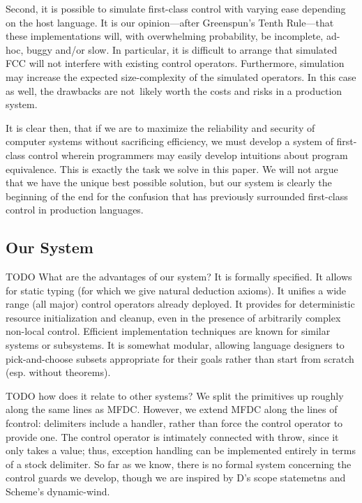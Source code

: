 \documentclass[11pt]{article}
\begin{document}
Second, it is possible to simulate first-class control with varying ease depending on the host language.
It is our opinion---after Greenspun's Tenth Rule---that these implementations will, with overwhelming probability, be incomplete, ad-hoc, buggy and/or slow.
In particular, it is difficult to arrange that simulated FCC will not interfere with existing control operators.\cite{addDelimControlProduction}
Furthermore, simulation may increase the expected size-complexity of the simulated operators.\cite{finalShiftForCallcc}
In this case as well, the drawbacks are not~likely worth the costs and risks in a production system.

It is clear then, that if we are to maximize the reliability and security of computer systems without sacrificing efficiency, we must develop a system of first-class control wherein programmers may easily develop intuitions about program equivalence.
This is exactly the task we solve in this paper.
We will not argue that we have the unique best possible solution, but our system is clearly the beginning of the end for the confusion that has previously surrounded first-class control in production languages.

\subsection{Our System}

TODO What are the advantages of our system?
It is formally specified.
It allows for static typing (for which we give natural deduction axioms).
It unifies a wide range (all major) control operators already deployed.
It provides for deterministic resource initialization and cleanup, even in the presence of arbitrarily complex non-local control.
Efficient implementation techniques are known for similar systems or subsystems.
It is somewhat modular, allowing language designers to pick-and-choose subsets appropriate for their goals rather than start from scratch (esp. without theorems).

TODO how does it relate to other systems?
We split the primitives up roughly along the same lines as MFDC.
However, we extend MFDC along the lines of fcontrol: delimiters include a handler, rather than force the control operator to provide one.
The control operator is intimately connected with throw, since it only takes a value; thus, exception handling can be implemented entirely in terms of a stock delimiter.
So far as we know, there is no formal system concerning the control guards we develop, though we are inspired by D's scope statemetns and Scheme's dynamic-wind. 
\end{document}
